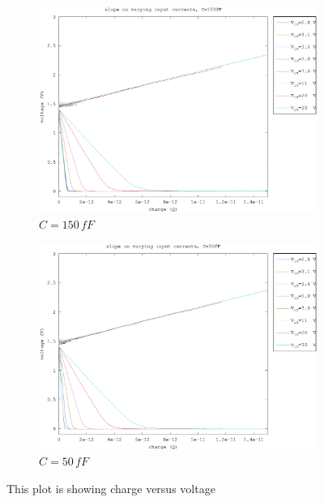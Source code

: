 \documentclass{article}
\begin{document}
\begin{figure}[h]
\begin{subfigure}[b]{0.475\textwidth}
	    \centering 
	    \includegraphics[width=\textwidth]{fig/bre_charge_150fF.eps}
	    \caption[]%
	    {$C=150\,fF$}    
	    \label{fig:bre_charges_150fF}
	\end{subfigure}
	\quad
	\begin{subfigure}[b]{0.475\textwidth}   
	    \centering 
	    \includegraphics[width=\textwidth]{fig/bre_charge_50fF.eps}
	    \caption[]%
	    {$C=50\,fF$}    
	    \label{fig:bre_charges_50fF}
	\end{subfigure}
	\caption{This plot is showing charge versus voltage}
	\label{fig:bre_charges}
\end{figure}
\end{document}
